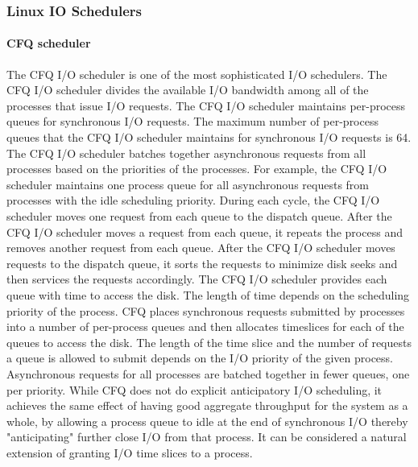 \documentclass{acmsig}
\begin{document}
  \subsubsection{Linux IO Schedulers}

    \paragraph{CFQ scheduler}
    The CFQ I/O scheduler is one of the most sophisticated I/O schedulers. The CFQ I/O scheduler divides the available I/O bandwidth among all of the processes that issue I/O requests. The CFQ I/O scheduler maintains per-process queues for synchronous I/O requests. The maximum number of per-process queues that the CFQ I/O scheduler maintains for synchronous I/O requests is 64. The CFQ I/O scheduler batches together asynchronous requests from all processes based on the priorities of the processes. For example, the CFQ I/O scheduler maintains one process queue for all asynchronous requests from processes with the idle scheduling priority.
    During each cycle, the CFQ I/O scheduler moves one request from each queue to the dispatch queue. After the CFQ I/O scheduler moves a request from each queue, it repeats the process and removes another request from each queue. After the CFQ I/O scheduler moves requests to the dispatch queue, it sorts the requests to minimize disk seeks and then services the requests accordingly. The CFQ I/O scheduler provides each queue with time to access the disk. The length of time depends on the scheduling priority of the process.
    CFQ places synchronous requests submitted by processes into a number of per-process queues and then allocates timeslices for each of the queues to access the disk. The length of the time slice and the number of requests a queue is allowed to submit depends on the I/O priority of the given process. Asynchronous requests for all processes are batched together in fewer queues, one per priority. While CFQ does not do explicit anticipatory I/O scheduling, it achieves the same effect of having good aggregate throughput for the system as a whole, by allowing a process queue to idle at the end of synchronous I/O thereby "anticipating" further close I/O from that process. It can be considered a natural extension of granting I/O time slices to a process.
\end{document}
